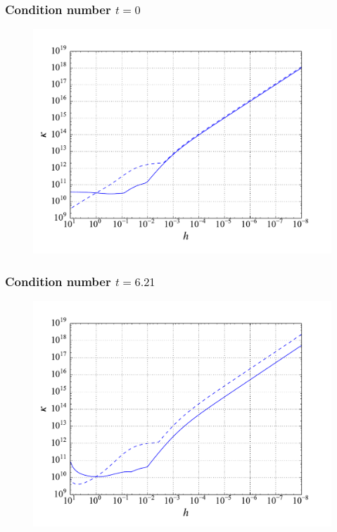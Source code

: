 \documentclass[]{beamer}
\begin{document}
\begin{frame}
\frametitle{Condition number $t = 0$}
\begin{figure}[H]
	\centering
	\includegraphics[width=\linewidth]{cond_0.pdf}
\end{figure}
\end{frame}

\begin{frame}
\frametitle{Condition number $t = 6.21$}
\begin{figure}[H]
	\centering
	\includegraphics[width=\linewidth]{cond_621.pdf}
\end{figure}
\end{frame}
\end{document}
